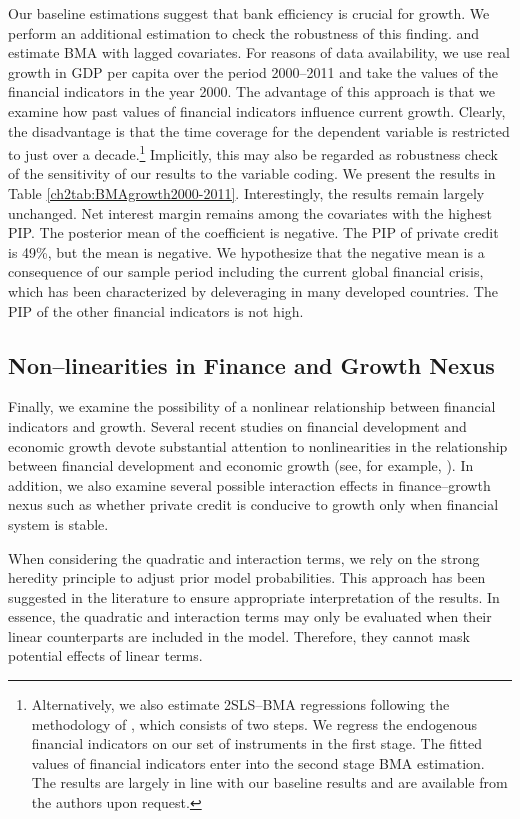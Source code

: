 Our baseline estimations suggest that bank efficiency is crucial for growth. We perform an additional estimation to check the robustness of this finding. and estimate \ac{BMA} with lagged covariates. For reasons of data availability, we use real growth in GDP per capita over the period 2000--2011 and take the values of the financial indicators in the year 2000. The advantage of this approach is that we examine how past values of financial indicators influence current growth. Clearly, the disadvantage is that the time coverage for the dependent variable is restricted to just over a decade.\footnote{Alternatively, we also estimate 2SLS--\ac{BMA} regressions following the methodology of \citet{Durlaufetal2008}, which consists of two steps. We regress the endogenous financial indicators on our set of instruments in the first stage. The fitted values of financial indicators enter into the second stage \ac{BMA} estimation. The results are largely in line with our baseline results and are available from the authors upon request.} Implicitly, this may also be regarded as robustness check of the sensitivity of our results to the variable coding. We present the results in Table \ref{ch2tab:BMAgrowth2000-2011}. Interestingly, the results remain largely unchanged. Net interest margin remains among the covariates with the highest \ac{PIP}. The posterior mean of the coefficient is negative. The \ac{PIP} of private credit is 49\%, but the mean is negative. We hypothesize that the negative mean is a consequence of our sample period including the current global financial crisis, which has been characterized by deleveraging in many developed countries. The \ac{PIP} of the other financial indicators is not high.

\subsection{Non--linearities in Finance and Growth Nexus}
Finally, we examine the possibility of a nonlinear relationship between financial indicators and growth. Several recent studies on financial development and economic growth devote substantial attention to nonlinearities in the relationship between financial development and economic growth (see, for example, \citet{CecchettiKharroubi2012, LawSingh2014}). In addition, we also examine several possible interaction effects in finance--growth nexus such as whether private credit is conducive to growth only when financial system is stable.

When considering the quadratic and interaction terms, we rely on the strong heredity principle to adjust prior model probabilities. This approach has been suggested in the literature to ensure appropriate interpretation of the results. In essence, the quadratic and interaction terms may only be evaluated when their linear counterparts are included in the model. Therefore, they cannot mask potential effects of linear terms. 

